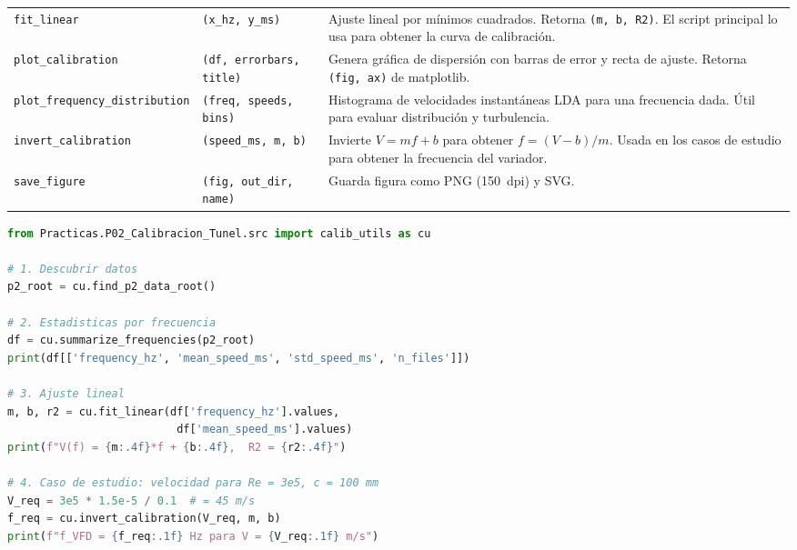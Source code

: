 \documentclass[12pt,a4paper]{article}
\begin{document}
\begin{table}[H]
\begin{tabularx}{\textwidth}{l l X}
		\texttt{fit\_linear}
		                 & \texttt{(x\_hz, y\_ms)}
		                 & Ajuste lineal por mínimos cuadrados.  Retorna \texttt{(m, b, R2)}.
		El script principal lo usa para obtener la curva de
		calibración.                                                                                                       \\
		\texttt{plot\_calibration}
		                 & \texttt{(df, errorbars, title)}
		                 & Genera gráfica de dispersión con barras de error y recta de ajuste.
		Retorna \texttt{(fig, ax)} de matplotlib.                                                                          \\
		\texttt{plot\_frequency\_distribution}
		                 & \texttt{(freq, speeds, bins)}
		                 & Histograma de velocidades instantáneas LDA para una frecuencia
		dada.  Útil para evaluar distribución y turbulencia.                                                               \\
		\texttt{invert\_calibration}
		                 & \texttt{(speed\_ms, m, b)}
		                 & Invierte $V = mf + b$ para obtener $f = (V - b)/m$.  Usada en
		los casos de estudio para obtener la frecuencia del variador.                                                      \\
		\texttt{save\_figure}
		                 & \texttt{(fig, out\_dir, name)}
		                 & Guarda figura como PNG (\SI{150}{dpi}) y SVG.                                                   \\
		\bottomrule
	\end{tabularx}
\end{table}

\begin{lstlisting}[language=Python,caption={Uso básico del módulo
  \texttt{calib\_utils.py}.}]
from Practicas.P02_Calibracion_Tunel.src import calib_utils as cu

# 1. Descubrir datos
p2_root = cu.find_p2_data_root()

# 2. Estadisticas por frecuencia
df = cu.summarize_frequencies(p2_root)
print(df[['frequency_hz', 'mean_speed_ms', 'std_speed_ms', 'n_files']])

# 3. Ajuste lineal
m, b, r2 = cu.fit_linear(df['frequency_hz'].values,
                          df['mean_speed_ms'].values)
print(f"V(f) = {m:.4f}*f + {b:.4f},  R2 = {r2:.4f}")

# 4. Caso de estudio: velocidad para Re = 3e5, c = 100 mm
V_req = 3e5 * 1.5e-5 / 0.1  # = 45 m/s
f_req = cu.invert_calibration(V_req, m, b)
print(f"f_VFD = {f_req:.1f} Hz para V = {V_req:.1f} m/s")
\end{lstlisting}
\end{document}
